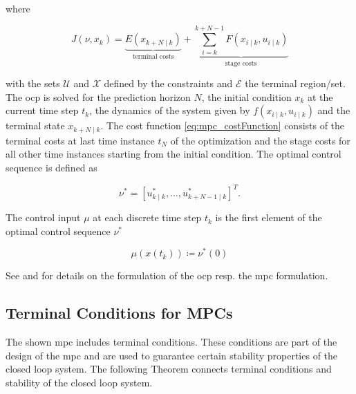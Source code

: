 \documentclass[10pt,a4paper,titlepage]{article}
\begin{document}
where

\begin{equation}
\label{eq:mpc_costFunction}
    J\left(\nu, x_k\right)=\underbrace{E\left(x_{k+N \mid k}\right)}_{\text{terminal costs}} + \underbrace{\sum_{i=k}^{k+N-1} F\left(x_{i \mid k}, u_{i \mid k}\right)}_{\text{stage costs}}
\end{equation}

with the sets $\mathcal{U}$ and $\mathcal{X}$ defined by the constraints and $\mathcal{E}$ the terminal region/set.
The \gls{ocp} is solved for the prediction horizon $N$, the initial condition $x_k$ at the current time step $t_k$, the dynamics
of the system given by $f\left(x_{i \mid k}, u_{i \mid k}\right)$ and the terminal state $x_{k+N \mid k}$. The cost function \eqref{eq:mpc_costFunction}
consists of the terminal costs at last time instance $t_N$ of the optimization and the stage costs for all other time instances starting from
the initial condition. The optimal control sequence is defined as

\begin{equation}
	\nu^* = [u_{k \mid k}^*, \dots , u_{k+N-1\mid k}^*]^T.
\end{equation}

The control input $\mu$ at each discrete time step $t_k$ is the first element of the optimal control sequence $\nu^*$

\begin{equation}
\mu(x(t_k)) \coloneqq \nu^*(0)
\end{equation}

See \cite{nmpcBible} and \cite{RaffAllgoewer} for details on the formulation of the \gls{ocp} resp. the \gls{mpc} formulation.

\subsection{Terminal Conditions for MPCs}
The shown \gls{mpc} includes terminal conditions. These conditions are part of the design of the \gls{mpc} and are used to
guarantee certain stability properties of the closed loop system. The following Theorem connects terminal conditions and
stability of the closed loop system. \cite{RaffAllgoewer}
\end{document}
